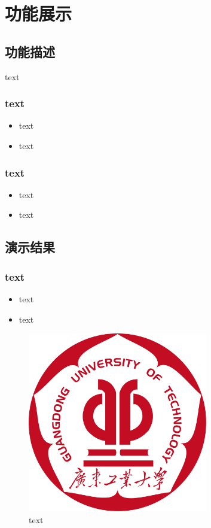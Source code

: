 
\section{功能展示}

\subsection{功能描述}
text
\subsubsection{text}
\begin{itemize}
    \item text
    \item text
\end{itemize}
\subsubsection{text}

\begin{itemize}
    \item text
    \item text
\end{itemize}
\subsection{演示结果}
\subsubsection{text}
\begin{itemize}
    \item text
    \item text
\end{itemize}
\begin{figure}[h]
    \centering
    \includegraphics[width=0.7\textwidth]{figures/logo.pdf}
    \caption{text}
\end{figure}

